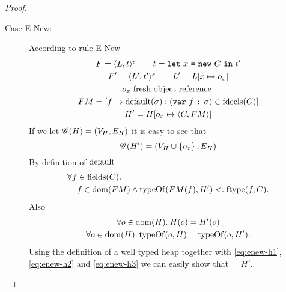 \begin{proof}
\begin{description}
\begin{description}
\begin{description}
            \item[Case {\sc E-New}:] According to rule {\sc E-New}
              \begin{equation} \label{eq:enew1}
                \begin{gathered} 
                  F = \mbox{$\langle L, t \rangle^s$} \quad\quad t = \mbox{\mdseries\texttt{let}~$x$~\texttt{=}~$\mbox{\mdseries\texttt{new}~$C$}$~\texttt{in}~$t'$} \\
                  F' = \mbox{$\langle L', t' \rangle^s$} \quad\quad L' = L[x \mapsto o_x] \\
                  o_x \text{ fresh object reference } \\
                  FM = [f \mapsto \mbox{$\mathrm{default}$}(\sigma): (\mbox{\mdseries\texttt{var}~$f$~\texttt{:}~$\sigma$}) \in
                  \mbox{$\mathrm{fdecls}$}(C)] \\
                  H' = H[o_x \mapsto \mbox{$\langle C, FM \rangle$}]
                \end{gathered}
              \end{equation}
              If we let $\mathscr{G}(H) = (V_H, E_H)$ it is easy to see that
              \begin{equation}
                \mathscr{G}(H') = ( V_H \cup \left\{ o_x \right\}, E_H )
              \end{equation}
              By definition of $\mbox{$\mathrm{default}$}$
              \begin{equation} \label{eq:enew-h1}
                \begin{aligned}
                  \forall f &\in \mbox{$\mathrm{fields}$}(C).\\
                  &f \in \mbox{$\mathrm{dom}$}(FM) \land \mbox{$\mathrm{typeOf}$}(FM(f), H') <: \mbox{$\mathrm{ftype}$}(f, C).
                \end{aligned}
              \end{equation}
              Also
              \begin{gather}
                \forall o \in \mbox{$\mathrm{dom}$}(H). \: H(o) = H'(o) \label{eq:enew-h2}\\
                \forall o \in \mbox{$\mathrm{dom}$}(H). \: \mbox{$\mathrm{typeOf}$}(o, H) = \mbox{$\mathrm{typeOf}$}(o, H').
                \label{eq:enew-h3}
              \end{gather}
              Using the definition of a well typed heap together with
              \eqref{eq:enew-h1}, \eqref{eq:enew-h2} and \eqref{eq:enew-h3} we
              can easily show that $\vdash H'$.


\end{description}
\end{description}
\end{description}
\end{proof}
